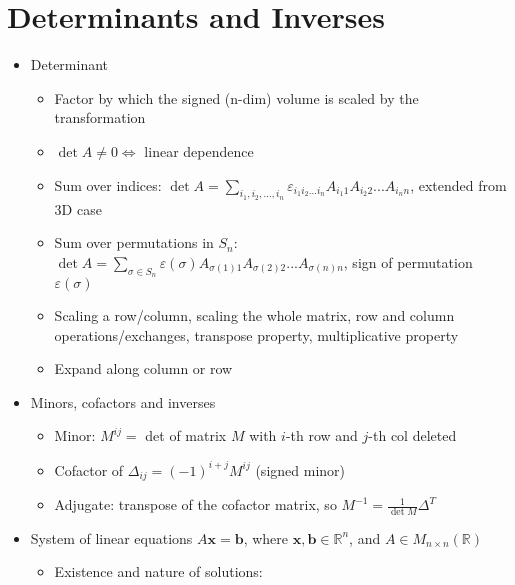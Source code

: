 \section{Determinants and Inverses}
\begin{itemize}
      \item Determinant
            \begin{itemize}
                  \item Factor by which the signed (n-dim) volume is scaled by the transformation
                  \item $\det A\neq0\iff$ linear dependence
                  \item Sum over indices: ${\displaystyle \det A=\sum_{i_{1},i_{2},...,i_{n}}\varepsilon_{i_{1}i_{2}...i_{n}}A_{i_{1}1}A_{i_{2}2}...A_{i_{n}n}}$,
                        extended from 3D case
                  \item Sum over permutations in $S_{n}$:${\displaystyle \det A=\sum_{\sigma\in S_{n}}\varepsilon(\sigma)}A_{\sigma(1)1}A_{\sigma(2)2}...A_{\sigma(n)n}$,
                        sign of permutation $\varepsilon(\sigma)$
                  \item Scaling a row/column, scaling the whole matrix, row and column operations/exchanges,
                        transpose property, multiplicative property
                  \item Expand along column or row
            \end{itemize}
      \item Minors, cofactors and inverses
            \begin{itemize}
                  \item Minor: $M^{ij}=$ det of matrix $M$ with $i$-th row and $j$-th
                        col deleted
                  \item Cofactor of $\Delta_{ij}=(-1)^{i+j}M^{ij}$ (signed minor)
                  \item Adjugate: transpose of the cofactor matrix, so $M^{-1}=\frac{1}{\det M}\Delta^{T}$
            \end{itemize}
      \item System of linear equations $A\mathbf{x}=\mathbf{b}$, where $\mathbf{x},\boldsymbol{b}\in\mathbb{R}^{n}$,
            and $A\in M_{n\times n}(\mathbb{R})$
            \begin{itemize}
                  \item Existence and nature of solutions:
                        \begin{itemize}

\end{itemize}
\end{itemize}
\end{itemize}
